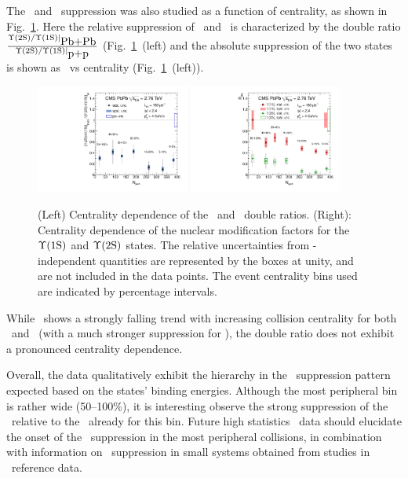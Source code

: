 The \PgUa\ and \PgUb\ suppression was also studied as a function of centrality, 
as shown in Fig.~\ref{fig:GR:centrality}.
Here the relative suppression of \PgUa\ and \PgUb\ is characterized by 
the double ratio $\frac{\Upsilon\mathrm{(2S)}/\Upsilon\mathrm{(1S)}|_{\mbox{Pb+Pb}}}{\Upsilon\mathrm{(2S)}/\Upsilon\mathrm{(1S)}|_{\mbox{p+p}}}$ 
(Fig.~\ref{fig:GR:centrality}~(left) and the absolute suppression 
of the two states is shown as \Raa\ vs centrality (Fig.~\ref{fig:GR:centrality}~(left)).

\begin{figure}[t]
\begin{center}
   \includegraphics[width=0.45\textwidth]{qqbarfigures/chi2VsCent}
   \includegraphics[width=0.45\textwidth]{qqbarfigures/RaaPt4}
  \caption{(Left) Centrality dependence of the \PgUa\ and \PgUb\ double ratios.  (Right): 
Centrality dependence of the nuclear modification factors for the $\Upsilon\mathrm{(1S)}$ and $\Upsilon\mathrm{(2S)}$ states. 
The relative uncertainties from \npart-independent quantities 
are represented by the boxes at unity, and are not included in the data points.
The event centrality bins used are indicated by percentage intervals.}
\label{fig:GR:centrality}
\end{center}
\end{figure}

While \Raa\ shows a strongly falling trend with increasing collision centrality
for both \PgUa\ and \PgUb\ (with a much stronger suppression for \PgUb), the 
double ratio does not exhibit a pronounced centrality dependence.

Overall, the data qualitatively exhibit the hierarchy in the \PgUn\ suppression pattern
expected based on the states' binding energies. Although the most peripheral bin
is rather wide (50--100\%), it is interesting observe the strong suppression of the 
\PgUb\ relative to the \PgUa\ already for this bin. Future high statistics \PbPb\ data 
should elucidate the onset of the \PgU\ suppression in the most peripheral collisions,
in combination with information on \PgU\ suppression in small systems obtained from
studies in \pPb\ reference data. 

